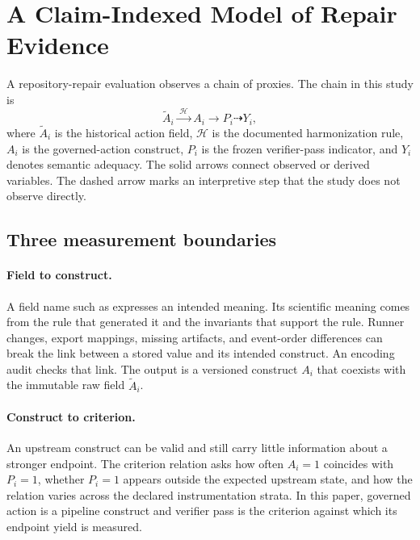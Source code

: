 \section{A Claim-Indexed Model of Repair Evidence}
\label{sec:framework}

A repository-repair evaluation observes a chain of proxies. The chain in this study is
\begin{equation}
\widetilde A_i
\xrightarrow{\;\mathcal H\;}
A_i
\longrightarrow
P_i
\dashrightarrow
Y_i,
\label{eq:evidence-chain}
\end{equation}
where $\widetilde A_i$ is the historical action field, $\mathcal H$ is the documented harmonization rule, $A_i$ is the governed-action construct, $P_i$ is the frozen verifier-pass indicator, and $Y_i$ denotes semantic adequacy. The solid arrows connect observed or derived variables. The dashed arrow marks an interpretive step that the study does not observe directly.

\subsection{Three measurement boundaries}

\paragraph{Field to construct.}
A field name such as  expresses an intended meaning. Its scientific meaning comes from the rule that generated it and the invariants that support the rule. Runner changes, export mappings, missing artifacts, and event-order differences can break the link between a stored value and its intended construct. An encoding audit checks that link. The output is a versioned construct $A_i$ that coexists with the immutable raw field $\widetilde A_i$.

\paragraph{Construct to criterion.}
An upstream construct can be valid and still carry little information about a stronger endpoint. The criterion relation asks how often $A_i=1$ coincides with $P_i=1$, whether $P_i=1$ appears outside the expected upstream state, and how the relation varies across the declared instrumentation strata. In this paper, governed action is a pipeline construct and verifier pass is the criterion against which its endpoint yield is measured.

